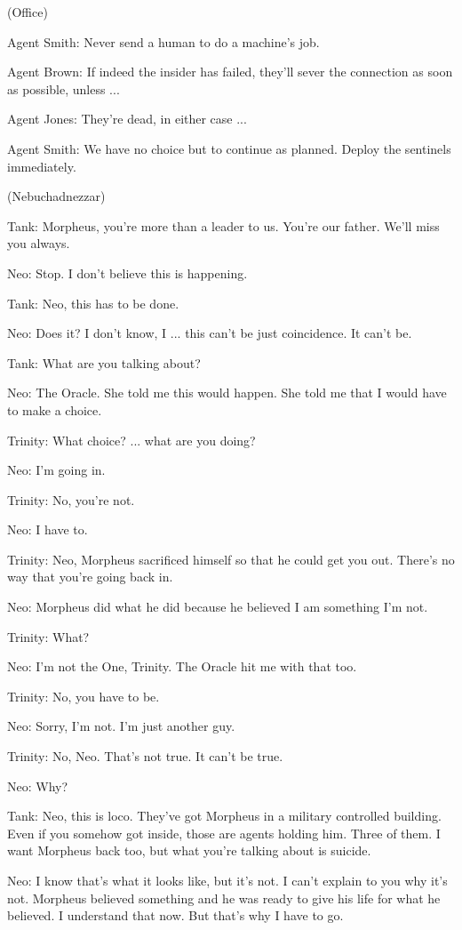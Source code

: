 \documentclass{ctexart}
\newenvironment{myquote}{\color{green} \setlength{\leftskip}{6em} \setlength{\rightskip}{4em} \setlength{\parindent}{-2em}}{\par}
\begin{document}
\begin{myquote}
(Office)

Agent Smith: Never send a human to do a machine's job.

Agent Brown: If indeed the insider has failed, they'll sever the connection as soon as possible, unless ...

Agent Jones: They're dead, in either case ...

Agent Smith: We have no choice but to continue as planned. Deploy the sentinels immediately.

(Nebuchadnezzar)

Tank: Morpheus, you're more than a leader to us. You're our father. We'll miss you always.

Neo: Stop. I don't believe this is happening.

Tank: Neo, this has to be done.

Neo: Does it? I don't know, I ... this can't be just coincidence. It can't be.

Tank: What are you talking about?

Neo: The Oracle. She told me this would happen. She told me that I would have to make a choice.

Trinity: What choice? ... what are you doing?

Neo: I'm going in.

Trinity: No, you're not.

Neo: I have to.

Trinity: Neo, Morpheus sacrificed himself so that he could get you out. There's no way that you're going back in.

Neo: Morpheus did what he did because he believed I am something I'm not.

Trinity: What?

Neo: I'm not the One, Trinity. The Oracle hit me with that too.

Trinity: No, you have to be.

Neo: Sorry, I'm not. I'm just another guy.

Trinity: No, Neo. That's not true. It can't be true.

Neo: Why?

Tank: Neo, this is loco. They've got Morpheus in a military controlled building. Even if you somehow got inside, those are agents holding him. Three of them. I want Morpheus back too, but what you're talking about is suicide.

Neo: I know that's what it looks like, but it's not. I can't explain to you why it's not. Morpheus believed something and he was ready to give his life for what he believed. I understand that now. But that's why I have to go.


\end{myquote}
\end{document}
